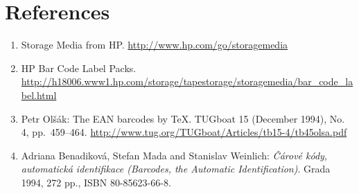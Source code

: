 \documentclass[11pt]{article}
\begin{document}
\section{References}
\begin{enumerate}\itemsep 0mm \parsep 0mm
\item Storage Media from HP. \url{http://www.hp.com/go/storagemedia}\label{hpstorage}
\item HP Bar Code Label Packs.
\url{http://h18006.www1.hp.com/storage/tapestorage/storagemedia/bar\_code\_label.html}\label{hplabel}
\item Petr Olšák: The EAN barcodes by \TeX. TUGboat 15 (December 1994), No. 4, pp.~459--464.
\url{http://www.tug.org/TUGboat/Articles/tb15-4/tb45olsa.pdf}\label{olsak}
 
\item Adriana Benadiková, Stefan Mada and Stanislav
Weinlich: \textit{Čárové kódy, automatická iden\-ti\-fi\-kace (Barcodes, the Automatic
Identification)}.
Grada 1994, 272 pp., ISBN \hbox{80-85623-66-8}.
\end{enumerate}
\end{document}

